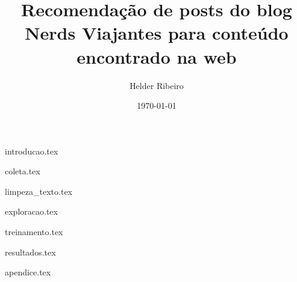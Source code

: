 \documentclass{article}
\title{Recomendação de posts do blog Nerds Viajantes para conteúdo encontrado na web}
\author{Helder Ribeiro}
\date{\today}
\begin{document}

\maketitle

\pagebreak

\tableofcontents{}

\pagebreak

{introducao.tex}

\pagebreak

{coleta.tex}

\pagebreak

{limpeza_texto.tex}

\pagebreak

{exploracao.tex}

\pagebreak

{treinamento.tex}

\pagebreak



\pagebreak

{resultados.tex}

\pagebreak



\pagebreak



\pagebreak

{apendice.tex}
\end{document}
